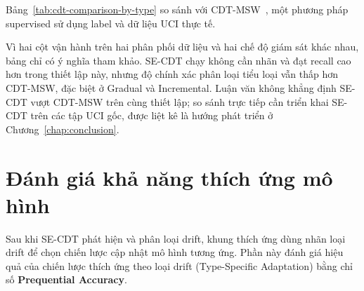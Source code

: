 Bảng~\ref{tab:cdt-comparison-by-type} so sánh với CDT-MSW~\cite{guo2022cdtmsw}, một phương pháp supervised sử dụng label và dữ liệu UCI thực tế.

\begin{table}[H]
	\centering
	\caption[So sánh phân loại CDT-MSW vs SE-CDT]{So sánh độ chính xác phân loại theo từng loại drift giữa CDT-MSW (Guo et al.~2022) và SE-CDT. Đây là đối chiếu tham khảo, không phải so sánh đồng điều kiện: CDT-MSW chạy có giám sát trên 10 tập UCI thực tế với ACC$_\text{subcat}$ tính có điều kiện trên các drift được phát hiện và phân nhóm đúng; SE-CDT chạy không giám sát trên 6 kịch bản Gaussian 5-D (Mục~\ref{sec:classification-setup}) với SUB tính trên toàn bộ ground truth. Ngoài ra ``EDR'' trong~\cite{guo2022cdtmsw} viết tắt cho \textit{Error Detection Rate} (càng thấp càng tốt), khác với ``EDR'' của luận văn (\textit{Event Detection Rate}, tương đương Recall); giá trị $82.5\%$ ở cột trái suy từ MDR Bảng~5 của bài báo gốc.}
	\label{tab:cdt-comparison-by-type}
	
\end{table}

Vì hai cột vận hành trên hai phân phối dữ liệu và hai chế độ giám sát khác nhau, bảng chỉ có ý nghĩa tham khảo. SE-CDT chạy không cần nhãn và đạt recall cao hơn trong thiết lập này, nhưng độ chính xác phân loại tiểu loại vẫn thấp hơn CDT-MSW, đặc biệt ở Gradual và Incremental. Luận văn không khẳng định SE-CDT vượt CDT-MSW trên cùng thiết lập; so sánh trực tiếp cần triển khai SE-CDT trên các tập UCI gốc, được liệt kê là hướng phát triển ở Chương~\ref{chap:conclusion}.

\section{Đánh giá khả năng thích ứng mô hình}
\label{sec:adaptation-eval}

Sau khi SE-CDT phát hiện và phân loại drift, khung thích ứng dùng nhãn loại drift để chọn chiến lược cập nhật mô hình tương ứng. Phần này đánh giá hiệu quả của chiến lược thích ứng theo loại drift (Type-Specific Adaptation) bằng chỉ số \textbf{Prequential Accuracy}.

